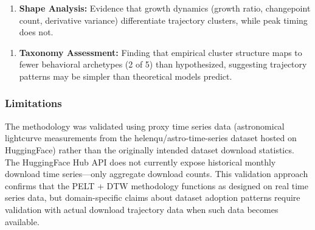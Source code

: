 \begin{enumerate}
\item \textbf{Shape Analysis:} Evidence that growth dynamics (growth ratio, changepoint count, derivative variance) differentiate trajectory clusters, while peak timing does not.
\end{enumerate}

\begin{enumerate}
\item \textbf{Taxonomy Assessment:} Finding that empirical cluster structure maps to fewer behavioral archetypes (2 of 5) than hypothesized, suggesting trajectory patterns may be simpler than theoretical models predict.
\end{enumerate}

\subsubsection{Limitations}

The methodology was validated using proxy time series data (astronomical lightcurve measurements from the helenqu/astro-time-series dataset hosted on HuggingFace) rather than the originally intended dataset download statistics. The HuggingFace Hub API does not currently expose historical monthly download time series---only aggregate download counts. This validation approach confirms that the PELT + DTW methodology functions as designed on real time series data, but domain-specific claims about dataset adoption patterns require validation with actual download trajectory data when such data becomes available.
